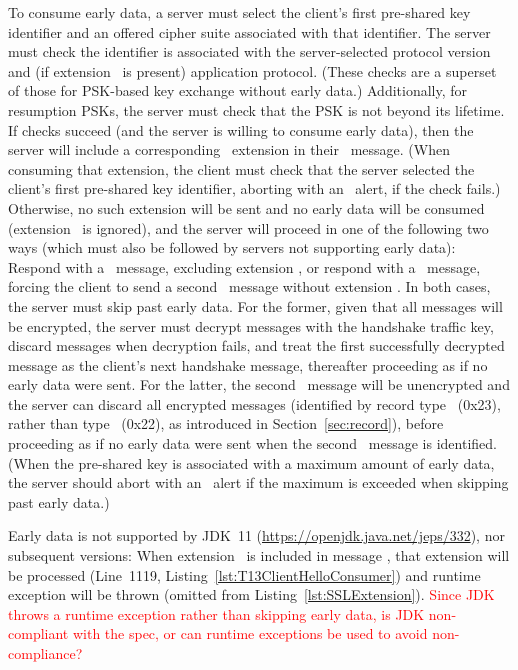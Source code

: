 To consume early data, a server must select the client's first pre-shared key
identifier and an offered cipher suite associated with that identifier. The
server must check the identifier is associated with the server-selected 
protocol version and (if extension \TLSapplicationLayerProtocolNegotiation\ is present) 
application protocol. (These checks are a superset of those for PSK-based key 
exchange without early data.) Additionally, for resumption PSKs, the server 
must check that the PSK is not beyond its lifetime. 
If checks succeed (and the server is willing to consume early data), 
then the server will include a corresponding \TLSearlyData\ extension
in their \EncryptedExtensions\ message.
(When consuming that extension, the client must check that the server selected
the client's first pre-shared key identifier, aborting with an \TLSillegalParameter\
alert, if the check fails.)
Otherwise, no such extension will 
be sent and no early data will be consumed (extension \TLSearlyData\ is
ignored), and the server will proceed in one of the following two ways (which 
must also be followed by servers not supporting early data): Respond 
with a \ServerHello\ message, excluding extension \TLSearlyData,
or respond with a \HelloRetryRequest\ message, forcing the client to send 
a second \ClientHello\ message without extension \TLSearlyData.
In both cases, the server must skip past early data. For the former, 
given that all messages will be encrypted, the server must decrypt 
messages with the handshake traffic key, discard messages when 
decryption fails, and treat the first successfully decrypted
message as the client's next handshake message, thereafter 
proceeding as if no early data were sent. 
For the latter, the second \ClientHello\ message will be unencrypted
and the server can discard all encrypted messages (identified by
record type \TLSapplicationData\ (0x23), rather than type \TLShandshake\
(0x22), as introduced in Section~\ref{sec:record}), before proceeding as 
if no early data were sent when the second \ClientHello\ message
is identified.
(When the pre-shared key is associated with a maximum amount of early 
data, the server should abort with an \TLSunexpectedMessage\ alert if 
the maximum is exceeded when skipping past early data.)



\begin{tcolorbox}
Early data is not supported by JDK~11 (\url{https://openjdk.java.net/jeps/332}),
nor subsequent versions: When extension \TLSearlyData\ is included in message
\ClientHello, that extension will be processed (Line~1119, Listing~\ref{lst:T13ClientHelloConsumer})
and runtime exception \code{UnsupportedOperationException} will be thrown 
(omitted from Listing~\ref{lst:SSLExtension}).
\ifImplNotes
\textcolor{red}{
Since JDK throws a runtime exception rather than skipping early data, 
is JDK non-compliant with the spec, or can runtime exceptions be used
to avoid non-compliance?
}
\fi
\end{tcolorbox}


